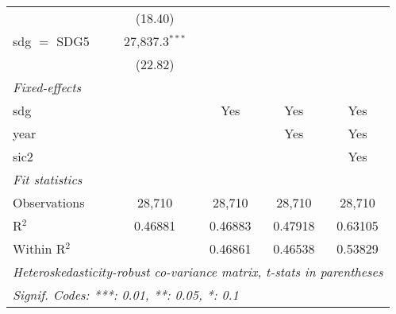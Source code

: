 \begin{tabular}{lcccc}
                 & (18.40)          &                  &                  &   \\   
   sdg $=$ SDG5  & 27,837.3$^{***}$ &                  &                  &   \\   
                 & (22.82)          &                  &                  &   \\   
   \midrule
   \emph{Fixed-effects}\\
   sdg           &                  & Yes              & Yes              & Yes\\  
   year          &                  &                  & Yes              & Yes\\  
   sic2          &                  &                  &                  & Yes\\  
   \midrule
   \emph{Fit statistics}\\
   Observations  & 28,710           & 28,710           & 28,710           & 28,710\\  
   R$^2$         & 0.46881          & 0.46883          & 0.47918          & 0.63105\\  
   Within R$^2$  &                  & 0.46861          & 0.46538          & 0.53829\\  
   \midrule \midrule
   \multicolumn{5}{l}{\emph{Heteroskedasticity-robust co-variance matrix, t-stats in parentheses}}\\
   \multicolumn{5}{l}{\emph{Signif. Codes: ***: 0.01, **: 0.05, *: 0.1}}\\
\end{tabular}
\par\endgroup


